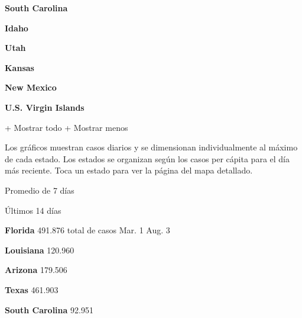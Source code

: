 \href{https://www.nytimes3xbfgragh.onion/interactive/2020/us/south-carolina-coronavirus-cases.html}{}

\textbf{South Carolina}

\href{https://www.nytimes3xbfgragh.onion/interactive/2020/us/idaho-coronavirus-cases.html}{}

\textbf{Idaho}

\href{https://www.nytimes3xbfgragh.onion/interactive/2020/us/utah-coronavirus-cases.html}{}

\textbf{Utah}

\href{https://www.nytimes3xbfgragh.onion/interactive/2020/us/kansas-coronavirus-cases.html}{}

\textbf{Kansas}

\href{https://www.nytimes3xbfgragh.onion/interactive/2020/us/new-mexico-coronavirus-cases.html}{}

\textbf{New Mexico}

\textbf{U.S. Virgin Islands}

+ Mostrar todo + Mostrar menos

Los gráficos muestran casos diarios y se dimensionan individualmente al
máximo de cada estado. Los estados se organizan según los casos per
cápita para el día más reciente. Toca un estado para ver la página del
mapa detallado.

\href{https://www.nytimes3xbfgragh.onion/interactive/2020/us/florida-coronavirus-cases.html}{}

Promedio de 7 días

Últimos 14 días

\textbf{Florida} 491.876 total de casos Mar. 1 Aug. 3

\href{https://www.nytimes3xbfgragh.onion/interactive/2020/us/louisiana-coronavirus-cases.html}{}

\textbf{Louisiana} 120.960

\href{https://www.nytimes3xbfgragh.onion/interactive/2020/us/arizona-coronavirus-cases.html}{}

\textbf{Arizona} 179.506

\href{https://www.nytimes3xbfgragh.onion/interactive/2020/us/texas-coronavirus-cases.html}{}

\textbf{Texas} 461.903

\href{https://www.nytimes3xbfgragh.onion/interactive/2020/us/south-carolina-coronavirus-cases.html}{}

\textbf{South Carolina} 92.951

\href{https://www.nytimes3xbfgragh.onion/interactive/2020/us/idaho-coronavirus-cases.html}{}


